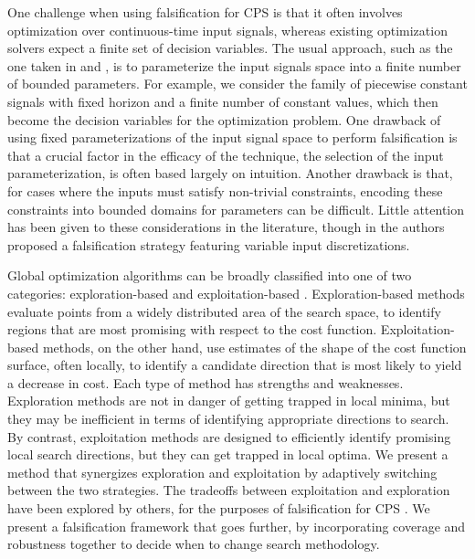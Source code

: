 One challenge when using falsification for CPS is that it often
involves optimization over continuous-time input signals, whereas
existing optimization solvers expect a finite set of decision variables. 
The usual approach, such as the one taken in \cite{BreachCAV10} and 
\cite{Nghiem10}, is  to parameterize the input signals space into a 
finite number of bounded parameters. For example, we consider the family of
piecewise constant signals with fixed horizon and a finite number of
constant values, which then become the decision variables for the optimization
problem. One drawback of using fixed parameterizations of the input signal space
to perform falsification
is that a crucial factor in the efficacy
of the technique, the selection of the input parameterization, 
is often based largely on intuition. Another drawback is that, for cases where the
inputs must satisfy non-trivial constraints, encoding these constraints 
into bounded domains for parameters can be difficult. Little attention has
been given to these considerations in the literature, though in 
\cite{DBLP:conf/atva/DeshmukhJKM15} the authors proposed a
falsification strategy featuring variable input discretizations.

Global optimization algorithms can be broadly classified into one of two
categories: exploration-based and exploitation-based \cite{Blum03}.
Exploration-based methods evaluate points from a widely distributed area 
of the search space, to identify regions that are most promising with 
respect to the cost function. Exploitation-based methods, on the other hand, 
use estimates of the shape of the cost function surface, often locally, to
identify a candidate direction that is most likely to yield a decrease
in cost.  Each type of method has strengths and weaknesses. Exploration
methods are not in danger of getting trapped in local minima, but they may 
be inefficient in terms of identifying appropriate directions to search.  By
contrast, exploitation methods are designed to efficiently identify
promising local search directions, but they can get trapped in local optima.
We present a method that synergizes exploration and 
exploitation by adaptively switching between the two strategies.
The tradeoffs between exploitation and exploration have been explored by others, 
for the purposes of falsification for CPS \cite{Ratschan14}. We present a falsification framework that goes further, by incorporating coverage and robustness together to decide when to change search methodology.

